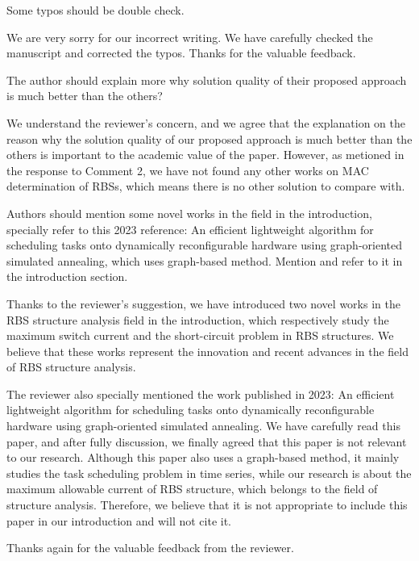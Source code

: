 \documentclass[12pt,american]{scrartcl}
\begin{document}
\begin{revcomment}
  Some typos should be double check.
\end{revcomment}
\begin{revresponse}

We are very sorry for our incorrect writing. We have carefully checked the manuscript and corrected the typos. Thanks for the valuable feedback.
  
\end{revresponse}

\begin{revcomment}
  The author should explain more why solution quality of their proposed approach is much better than the others?
\end{revcomment}
\begin{revresponse}

We understand the reviewer's concern, and we agree that the explanation on the reason why the solution quality of our proposed approach is much better than the others is important to the academic value of the paper. 
However, as metioned in the response to Comment 2,
we have not found any other works on MAC determination of RBSs, which means there is no other solution to compare with.
  
\end{revresponse}

\begin{revcomment}
  Authors should mention some novel works in the field in the introduction, specially refer to this 2023 reference: An efficient lightweight algorithm for scheduling tasks onto dynamically reconfigurable hardware using graph-oriented simulated annealing, which uses graph-based method. Mention and refer to it in the introduction section.
\end{revcomment}
\begin{revresponse}

Thanks to the reviewer's suggestion, we have introduced two novel works in the RBS structure analysis field in the introduction, which respectively study the maximum switch current \cite{han2021analysis} and the short-circuit problem \cite{chenSneakCircuitTheory2021} in RBS structures.
We believe that these works represent the innovation and recent advances in the field of RBS structure analysis.


The reviewer also specially mentioned the work published in 2023: An efficient lightweight algorithm for scheduling tasks onto dynamically reconfigurable hardware using graph-oriented simulated annealing.
We have carefully read this paper, and after fully discussion, we finally agreed that this paper is not relevant to our research.
Although this paper also uses a graph-based method, it mainly studies the task scheduling problem in time series, while our research is about the maximum allowable current of RBS structure, which belongs to the field of structure analysis.
Therefore, we believe that it is not appropriate to include this paper in our introduction and will not cite it.


Thanks again for the valuable feedback from the reviewer.
  
\end{revresponse}
\end{document}
